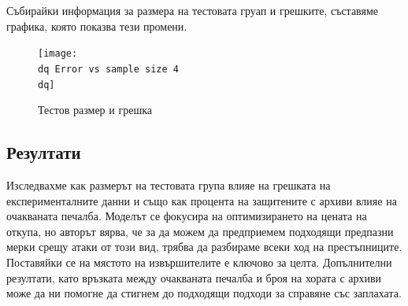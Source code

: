 \documentclass[11pt, a4paper]{article}
\theoremstyle{definition}
\begin{document}
				Събирайки информация за размера на тестовата груап и грешките, съставяме графика, която показва тези промени.
				\begin{figure}[H]
				\begin{minipage}{1.0\textwidth}
					\centering
					\texttt{[image: \\dq Error vs sample size 4\\dq]}
					\caption{Тестов размер и грешка}\label{Fig:Data5}
				\end{minipage}
				\end{figure}
		\subsection{Резултати}
			Изследвахме как размерът на тестовата група влияе на грешката на експерименталните данни и също как процента на защитените с архиви влияе на очакваната печалба. Моделът се фокусира на оптимизирането на цената на откупа, но авторът вярва, че за да можем да предприемем подходящи предпазни мерки срещу атаки от този вид, трябва да разбираме всеки ход на престъпниците. Поставяйки се на мястото на извършителите е ключово за целта. Допълнителни резултати, като връзката между очакваната печалба и броя на хората с архиви може да ни помогне да стигнем до подходящи подходи за справяне със заплахата.
\end{document}
